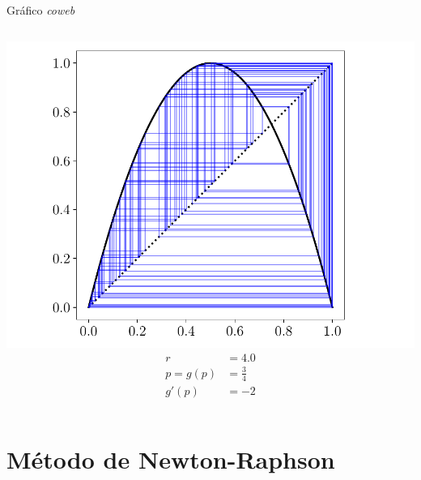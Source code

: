 \documentclass[9pt, aspectratio=169]{beamer}
\begin{document}
\begin{frame}{Gráfico \textit{coweb}}
\begin{columns}
    \begin{center}
      \includegraphics[scale=0.35]{figs/coweb-03.pdf}
      \begin{align*}
        r        & = 4.0         \\
        p = g(p) & = \frac{3}{4} \\
        g'(p)    & = -2
      \end{align*}
    \end{center}
  \end{columns}
\end{frame}

\section{Método de Newton-Raphson}
\end{document}
